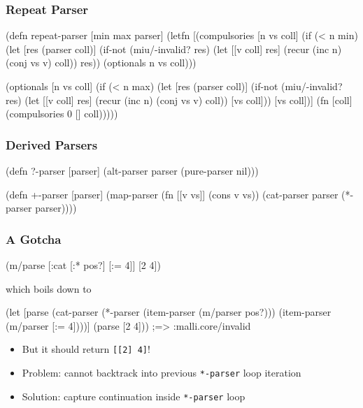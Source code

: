 \documentclass{beamer}
\begin{document}

\begin{frame}[fragile]
\frametitle{Repeat Parser}

{\scriptsize
\begin{semiverbatim}
(defn repeat-parser [min max parser]
  (letfn [(compulsories [n vs coll]
            (if (< n min)
              (let [res (parser coll)]
                (if-not (miu/-invalid? res)
                  (let [[v coll] res]
                    (recur (inc n) (conj vs v) coll))
                  res))
              (optionals n vs coll)))

          (optionals [n vs coll]
            (if (< n max)
              (let [res (parser coll)]
                (if-not (miu/-invalid? res)
                  (let [[v coll] res]
                    (recur (inc n) (conj vs v) coll))
                  [vs coll]))
              [vs coll])]
    (fn [coll] (compulsories 0 [] coll)))))
\end{semiverbatim}
}

\end{frame}


\begin{frame}[fragile]
\frametitle{Derived Parsers}

\begin{semiverbatim}
(defn ?-parser [parser]
  (alt-parser parser (pure-parser nil)))
\end{semiverbatim}

\begin{semiverbatim}
(defn +-parser [parser]
  (map-parser (fn [[v vs]] (cons v vs))
              (cat-parser parser (*-parser parser))))
\end{semiverbatim}

\end{frame}


\begin{frame}[fragile]
\frametitle{A Gotcha}

{\scriptsize
\begin{semiverbatim}
(m/parse [:cat [:* pos?] [:= 4]] [2 4])
\end{semiverbatim}

which boils down to

\begin{semiverbatim}
(let [parse (cat-parser (*-parser (item-parser (m/parser pos?)))
                        (item-parser (m/parser [:= 4])))]
  (parse [2 4])) ;=> :malli.core/invalid
\end{semiverbatim}
}

\begin{itemize}
\item But it should return \texttt{[[2] 4]}!
\item Problem: cannot backtrack into previous \texttt{*-parser} loop iteration
\item Solution: capture continuation inside \texttt{*-parser} loop
\end{itemize}

\end{frame}
\end{document}
